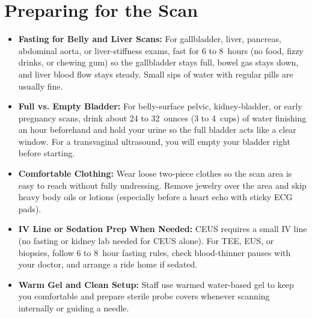 \section{Preparing for the Scan}
\begin{itemize}
  \item \textbf{Fasting for Belly and Liver Scans:} For gallbladder, liver, pancreas, abdominal aorta, or liver-stiffness exams, fast for 6 to 8~hours (no food, fizzy drinks, or chewing gum) so the gallbladder stays full, bowel gas stays down, and liver blood flow stays steady. Small sips of water with regular pills are usually fine.
  \item \textbf{Full vs. Empty Bladder:} For belly-surface pelvic, kidney-bladder, or early pregnancy scans, drink about 24 to 32~ounces (3 to 4~cups) of water finishing an hour beforehand and hold your urine so the full bladder acts like a clear window. For a transvaginal ultrasound, you will empty your bladder right before starting.
  \item \textbf{Comfortable Clothing:} Wear loose two-piece clothes so the scan area is easy to reach without fully undressing. Remove jewelry over the area and skip heavy body oils or lotions (especially before a heart echo with sticky ECG pads).
  \item \textbf{IV Line or Sedation Prep When Needed:} CEUS requires a small IV line (no fasting or kidney lab needed for CEUS alone). For TEE, EUS, or biopsies, follow 6 to 8~hour fasting rules, check blood-thinner pauses with your doctor, and arrange a ride home if sedated.
  \item \textbf{Warm Gel and Clean Setup:} Staff use warmed water-based gel to keep you comfortable and prepare sterile probe covers whenever scanning internally or guiding a needle.
\end{itemize}

